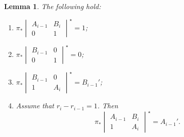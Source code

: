 \documentclass[pdftex]{sigma}
\numberwithin{equation}{section}
\newtheorem{Lemma}[Theorem]{Lemma}
\theoremstyle{definition}
\begin{document}
\begin{Lemma}\label{lemma:main-push} The following hold:
 \begin{enumerate}[label=$(\alph*)$]\itemsep=0pt
 \item $\pi_* \begin{vmatrix}
 A_{i-1} & B_i\\
 0 & 1
 \end{vmatrix}^\star= 1$;
 \item $\pi_* \begin{vmatrix}
 B_{i-1} & 0\\
 0 & 1
 \end{vmatrix}^\star = 0$;
 \item $\pi_* \begin{vmatrix} B_{i-1} & 0\\ 1 & A_{i} \end{vmatrix}^\star = B_{i-1}'$;
 \item Assume that $r_i - r_{i-1} = 1$. Then
 \[
 \pi_* \begin{vmatrix} A_{i-1} & B_i\\1 & A_i
 \end{vmatrix}^\star = A_{i-1}'.
 \]
 \end{enumerate}
 \end{Lemma}
\end{document}
